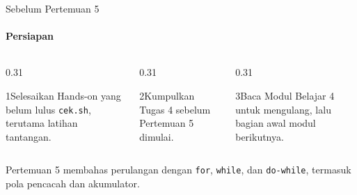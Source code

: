 \documentclass[t]{beamer}
\begin{document}
\begin{frame}{Sebelum Pertemuan 5}
\framesubtitle{Persiapan}
\begin{columns}[T]
\begin{column}{0.31\textwidth}
\begin{Langkah}{1}{Selesaikan}
Hands-on yang belum lulus \texttt{cek.sh}, terutama latihan tantangan.
\end{Langkah}
\end{column}
\begin{column}{0.31\textwidth}
\begin{Langkah}{2}{Kumpulkan}
Tugas 4 sebelum Pertemuan 5 dimulai.
\end{Langkah}
\end{column}
\begin{column}{0.31\textwidth}
\begin{Langkah}{3}{Baca}
Modul Belajar 4 untuk mengulang, lalu bagian awal modul berikutnya.
\end{Langkah}
\end{column}
\end{columns}
\vspace{10pt}
Pertemuan 5 membahas perulangan dengan \texttt{for}, \texttt{while}, dan \texttt{do-while}, termasuk pola pencacah dan akumulator.
\end{frame}

\end{document}
